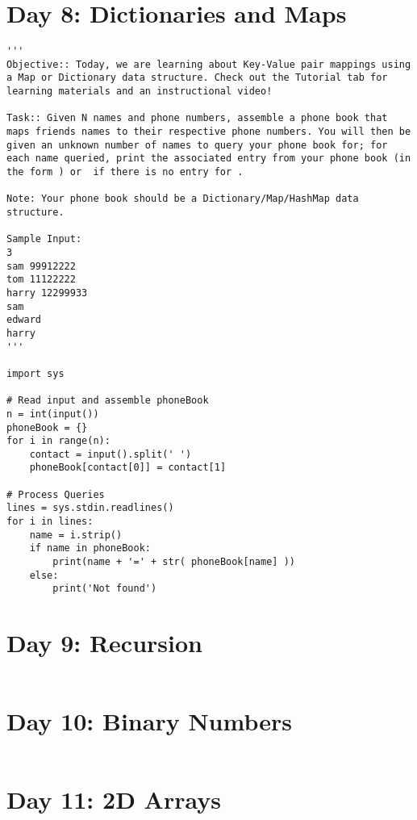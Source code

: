 \documentclass[11pt,a4paper]{article}
\begin{document}
\newpage
\section{Day 8: Dictionaries and Maps}
\begin{lstlisting}
'''
Objective:: Today, we are learning about Key-Value pair mappings using a Map or Dictionary data structure. Check out the Tutorial tab for learning materials and an instructional video!

Task:: Given N names and phone numbers, assemble a phone book that maps friends names to their respective phone numbers. You will then be given an unknown number of names to query your phone book for; for each name queried, print the associated entry from your phone book (in the form ) or  if there is no entry for .

Note: Your phone book should be a Dictionary/Map/HashMap data structure.

Sample Input:
3
sam 99912222
tom 11122222
harry 12299933
sam
edward
harry
'''

import sys 

# Read input and assemble phoneBook
n = int(input())
phoneBook = {}
for i in range(n):
    contact = input().split(' ')
    phoneBook[contact[0]] = contact[1]

# Process Queries
lines = sys.stdin.readlines()
for i in lines:
    name = i.strip()
    if name in phoneBook:
        print(name + '=' + str( phoneBook[name] ))
    else:
        print('Not found')
\end{lstlisting}





\newpage
\section{Day 9: Recursion}
\begin{lstlisting}
\end{lstlisting}

\newpage
\section{Day 10: Binary Numbers}
\begin{lstlisting}
\end{lstlisting}

\newpage
\section{Day 11: 2D Arrays}
\begin{lstlisting}
\end{lstlisting}
\end{document}
